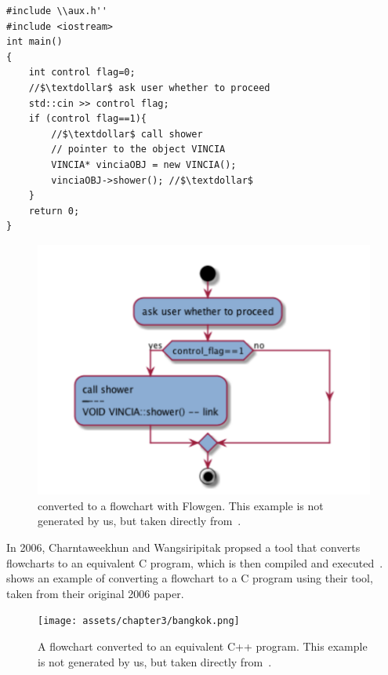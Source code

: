 \begin{lstlisting}[caption={A C++ program.}, captionpos=b, label={c++prog}]
#include \\aux.h''
#include <iostream>
int main()
{
    int control flag=0;
    //$\textdollar$ ask user whether to proceed
    std::cin >> control flag;
    if (control flag==1){
        //$\textdollar$ call shower
        // pointer to the object VINCIA
        VINCIA* vinciaOBJ = new VINCIA();
        vinciaOBJ->shower(); //$\textdollar$
    }
    return 0;
}
\end{lstlisting}

\begin{figure}[ht]
    \centering
    \includegraphics[scale=0.6]{assets/chapter3/Flowgen.png}
    \caption{ converted to a flowchart with Flowgen. This example is not generated by us, but taken directly from~\cite{flowgen}.}
    \label{flowgenExample}
\end{figure}

In 2006, Charntaweekhun and Wangsiripitak propsed a tool that converts flowcharts to an equivalent C program, which is then compiled and executed~\cite{flow2c}.  shows an example of converting a flowchart to a C program using their tool, taken from their original 2006 paper. \\

\begin{figure}[ht]
    \centering
    \texttt{[image: assets/chapter3/bangkok.png]}
    \caption{A flowchart converted to an equivalent C++ program. This example is not generated by us, but taken directly from~\cite{flow2c}.}
    \label{flow2cExample}
\end{figure}

